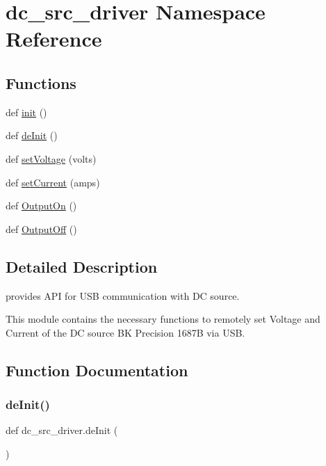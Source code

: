 \hypertarget{namespacedc__src__driver}{}\section{dc\+\_\+src\+\_\+driver Namespace Reference}
\label{namespacedc__src__driver}
\subsection*{Functions}
\begin{DoxyCompactItemize}
\item 
def \hyperlink{namespacedc__src__driver_a11161defaf468cbc5cb08e4d8c69a7bf}{init} ()
\item 
def \hyperlink{namespacedc__src__driver_a0d85b957d8219825193bc4f07a21ac0e}{de\+Init} ()
\item 
def \hyperlink{namespacedc__src__driver_a090e51c0489242cad54165afed01b7fb}{set\+Voltage} (volts)
\item 
def \hyperlink{namespacedc__src__driver_a46de53ee0b524cebc2ef80d30494490a}{set\+Current} (amps)
\item 
def \hyperlink{namespacedc__src__driver_ac2775edfbf5423716a549ffd61dc5c28}{Output\+On} ()
\item 
def \hyperlink{namespacedc__src__driver_aba85f65b955b92de14da69217df9dcbf}{Output\+Off} ()
\end{DoxyCompactItemize}


\subsection{Detailed Description}
\begin{DoxyVerb}provides API for USB communication with DC source.

This module contains the necessary functions to remotely set Voltage and
Current of the DC source BK Precision 1687B via USB.
\end{DoxyVerb}
 

\subsection{Function Documentation}
\mbox{\label{namespacedc__src__driver_a0d85b957d8219825193bc4f07a21ac0e}} 
\subsubsection{\texorpdfstring{de\+Init()}{deInit()}}
{\footnotesize\ttfamily def dc\+\_\+src\+\_\+driver.\+de\+Init (\begin{DoxyParamCaption}{ }\end{DoxyParamCaption})}

